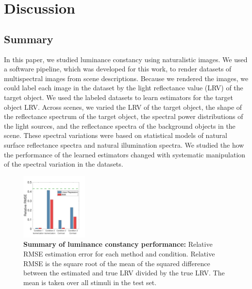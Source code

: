 \documentclass{jov}
\begin{document}

\section{Discussion} \label{Discussion}

\subsection{Summary}

In this paper, we studied luminance constancy using naturalistic images.
We used a software pipeline, which was developed for this work, to render datasets of multispectral images from scene descriptions.
Because we rendered the images, we could label each image in the dataset by the light reflectance value (LRV) of the target object.
We used the labeled datasets to learn estimators for the target object LRV.
Across scenes, we varied the LRV of the target object, the shape of the reflectance spectrum of the target object, 
the spectral power distributions of the light sources, and the reflectance spectra of the background objects in the scene.
These spectral variations were based on statistical models of natural surface reflectance spectra and natural illumination spectra.
We studied the how the performance of the learned estimators changed with systematic manipulation of the spectral variation in the datasets.


\begin{figure}
\centering
\includegraphics[width=0.3\textwidth]{../FiguresDraft5/Figure14/Figure14.pdf}
\caption{{\bf Summary of luminance constancy performance:} Relative RMSE estimation error for each method and condition. Relative RMSE is the square root of the mean of the squared difference between the estimated and true LRV divided by the true LRV. The mean is taken over all stimuli in the test set.}
 \label{fig:barGraphs}
\end{figure}
\end{document}
